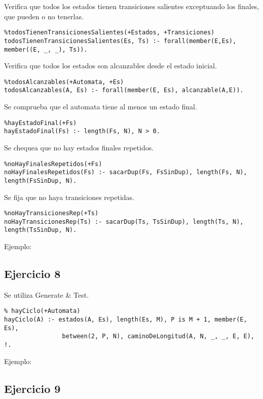 \documentclass[10pt, a4paper,english,spanish,hidelinks]{article}
\begin{document}
Verifica que todos los estados tienen transiciones salientes exceptuando los finales, que pueden
o no tenerlas.
\begin{verbatim}
%todosTienenTransicionesSalientes(+Estados, +Transiciones)
todosTienenTransicionesSalientes(Es, Ts) :- forall(member(E,Es), member((E, _, _), Ts)).
\end{verbatim}

Verifica que todos los estados son alcanzables desde el estado inicial.
\begin{verbatim}
%todosAlcanzables(+Automata, +Es)
todosAlcanzables(A, Es) :- forall(member(E, Es), alcanzable(A,E)). 
\end{verbatim}

Se comprueba que el automata tiene al menos un estado final.
\begin{verbatim}
%hayEstadoFinal(+Fs)
hayEstadoFinal(Fs) :- length(Fs, N), N > 0.
\end{verbatim}

Se chequea que no hay estados finales repetidos.
\begin{verbatim}
%noHayFinalesRepetidos(+Fs)
noHayFinalesRepetidos(Fs) :- sacarDup(Fs, FsSinDup), length(Fs, N), length(FsSinDup, N).
\end{verbatim}

Se fija que no haya transiciones repetidas.
\begin{verbatim}
%noHayTransicionesRep(+Ts)
noHayTransicionesRep(Ts) :- sacarDup(Ts, TsSinDup), length(Ts, N), length(TsSinDup, N).
\end{verbatim}

Ejemplo:


\subsection{Ejercicio 8}

Se utiliza Generate & Test.

\begin{verbatim}
% hayCiclo(+Automata)
hayCiclo(A) :- estados(A, Es), length(Es, M), P is M + 1, member(E, Es),
				between(2, P, N), caminoDeLongitud(A, N, _, _, E, E), !.

\end{verbatim}

Ejemplo:

\subsection{Ejercicio 9}
\end{document}
